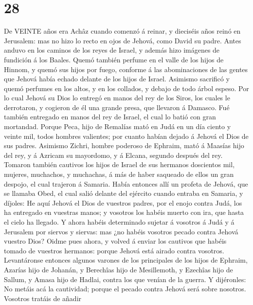 \hypertarget{section-27}{%
\section{28}\label{section-27}}

 De VEINTE años era Achâz cuando comenzó á reinar, y
dieciséis años reinó en Jerusalem: mas no hizo lo recto en ojos de
Jehová, como David su padre.  Antes anduvo en los caminos de
los reyes de Israel, y además hizo imágenes de fundición á los Baales.
 Quemó también perfume en el valle de los hijos de Hinnom, y
quemó sus hijos por fuego, conforme á las abominaciones de las gentes
que Jehová había echado delante de los hijos de Israel. 
Asimismo sacrificó y quemó perfumes en los altos, y en los collados, y
debajo de todo árbol espeso.  Por lo cual Jehová su Dios lo
entregó en manos del rey de los Siros, los cuales le derrotaron, y
cogieron de él una grande presa, que llevaron á Damasco. Fué también
entregado en manos del rey de Israel, el cual lo batió con gran
mortandad.  Porque Peca, hijo de Remalías mató en Judá en un
día ciento y veinte mil, todos hombres valientes; por cuanto habían
dejado á Jehová el Dios de sus padres.  Asimismo Zichri,
hombre poderoso de Ephraim, mató á Maasías hijo del rey, y á Azricam su
mayordomo, y á Elcana, segundo después del rey.  Tomaron
también cautivos los hijos de Israel de sus hermanos doscientos mil,
mujeres, muchachos, y muchachas, á más de haber saqueado de ellos un
gran despojo, el cual trajeron á Samaria.  Había entonces
allí un profeta de Jehová, que se llamaba Obed, el cual salió delante
del ejército cuando entraba en Samaria, y díjoles: He aquí Jehová el
Dios de vuestros padres, por el enojo contra Judá, los ha entregado en
vuestras manos; y vosotros los habéis muerto con ira, que hasta el cielo
ha llegado.  Y ahora habéis determinado sujetar á vosotros
á Judá y á Jerusalem por siervos y siervas: mas ¿no habéis vosotros
pecado contra Jehová vuestro Dios?  Oidme pues ahora, y
volved á enviar los cautivos que habéis tomado de vuestros hermanos:
porque Jehová está airado contra vosotros.  Levantáronse
entonces algunos varones de los principales de los hijos de Ephraim,
Azarías hijo de Johanán, y Berechîas hijo de Mesillemoth, y Ezechîas
hijo de Sallum, y Amasa hijo de Hadlai, contra los que venían de la
guerra.  Y dijéronles: No metáis acá la cautividad; porque
el pecado contra Jehová será sobre nosotros. Vosotros tratáis de añadir
